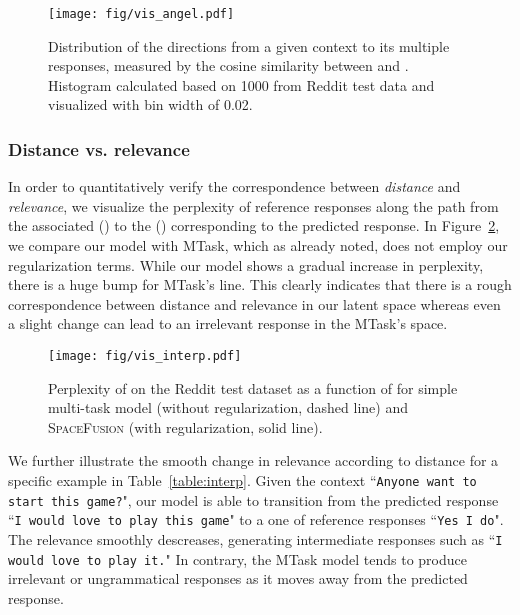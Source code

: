 \documentclass[11pt,a4paper]{article}
\begin{document}
\begin{figure}[ht]
    \centering
    \texttt{[image: fig/vis\_angel.pdf]}
    \caption{Distribution of the directions from a given context to its multiple responses, measured by the cosine similarity between  and . Histogram calculated based on 1000  from Reddit test data and visualized with bin width of 0.02.}
    \label{fig:vis_angel}
\end{figure}

\subsubsection{Distance vs. relevance} 
In order to quantitatively verify the correspondence between \textit{distance} and \textit{relevance}, we visualize the perplexity of reference responses along the path from the associated  () to the   () corresponding to the predicted response. In Figure~\ref{fig:vis_interp}, we compare our model with MTask, which as already noted, does not employ our regularization terms. While our model shows a gradual increase in perplexity, there is a huge bump for MTask's line. This clearly indicates that there is a rough correspondence between distance and relevance in our latent space whereas even a slight change can lead to an irrelevant response in the MTask's space. 



\begin{figure}[ht]
    \centering
    \texttt{[image: fig/vis\_interp.pdf]}
    \caption{Perplexity of  on the Reddit test dataset as a function of  for simple multi-task model (without regularization, dashed line) and \textsc{SpaceFusion} (with regularization, solid line).}
    \label{fig:vis_interp}
\end{figure}

We further illustrate the smooth change in relevance according to distance for a specific example in Table~\ref{table:interp}. Given the context ``\texttt{Anyone want to start this game?}", our model is able to transition from the predicted response ``\texttt{I would love to play this game}" to a one of reference responses ``\texttt{Yes I do}". The relevance smoothly descreases, generating intermediate responses such as ``\texttt{I would love to play it.}" In contrary, the MTask model tends to produce irrelevant or ungrammatical responses as it moves away from the predicted response.
\end{document}
